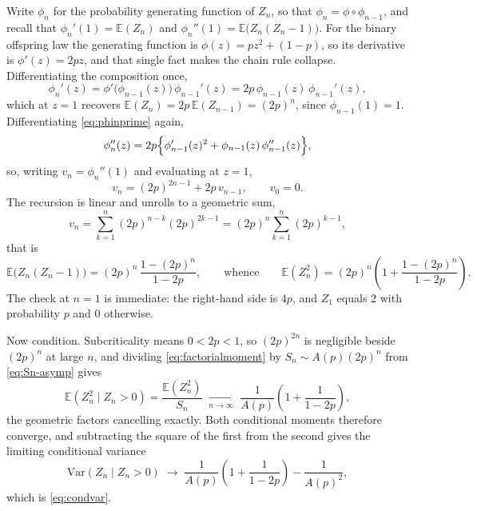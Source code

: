 \documentclass[11pt]{article}
\begin{document}
Write $\phi_n$ for the probability generating function of $Z_n$, so that $\phi_n=\phi\circ\phi_{n-1}$, and recall that $\phi_n'(1)=\mathbb{E}(Z_n)$ and $\phi_n''(1)=\mathbb{E}\bigl(Z_n(Z_n-1)\bigr)$. For the binary offspring law the generating function is $\phi(z)=pz^2+(1-p)$, so its derivative is $\phi'(z)=2pz$, and that single fact makes the chain rule collapse. Differentiating the composition once,
\begin{equation}
\label{eq:phinprime}
\phi_n'(z) = \phi'\bigl(\phi_{n-1}(z)\bigr)\,\phi_{n-1}'(z)
= 2p\,\phi_{n-1}(z)\,\phi_{n-1}'(z),
\end{equation}
which at $z=1$ recovers $\mathbb{E}(Z_n)=2p\,\mathbb{E}(Z_{n-1})=(2p)^n$, since $\phi_{n-1}(1)=1$. Differentiating \eqref{eq:phinprime} again,
\begin{equation}
\label{eq:phinsecond}
\phi_n''(z)
= 2p\Bigl\{\phi_{n-1}'(z)^2 + \phi_{n-1}(z)\,\phi_{n-1}''(z)\Bigr\},
\end{equation}
so, writing $v_n=\phi_n''(1)$ and evaluating at $z=1$,
\begin{equation}
\label{eq:vnrecursion}
v_n = (2p)^{2n-1} + 2p\,v_{n-1},
\qquad v_0 = 0 .
\end{equation}
The recursion is linear and unrolls to a geometric sum,
\[
v_n=\sum_{k=1}^{n}(2p)^{n-k}(2p)^{2k-1}
=(2p)^n\sum_{k=1}^{n}(2p)^{k-1},
\]
that is
\begin{equation}
\label{eq:factorialmoment}
\mathbb{E}\bigl(Z_n(Z_n-1)\bigr) = (2p)^n\,\frac{1-(2p)^n}{1-2p},
\qquad\text{whence}\qquad
\mathbb{E}(Z_n^2) = (2p)^n\left(1+\frac{1-(2p)^n}{1-2p}\right).
\end{equation}
The check at $n=1$ is immediate: the right-hand side is $4p$, and $Z_1$ equals $2$ with probability $p$ and $0$ otherwise.

Now condition. Subcriticality means $0<2p<1$, so $(2p)^{2n}$ is negligible beside $(2p)^n$ at large $n$, and dividing \eqref{eq:factorialmoment} by $S_n\sim A(p)(2p)^n$ from \eqref{eq:Sn-asymp} gives
\begin{equation}
\label{eq:condsecondmoment}
\mathbb{E}(Z_n^2\mid Z_n>0)
= \frac{\mathbb{E}(Z_n^2)}{S_n}
\;\xrightarrow[n\to\infty]{}\;
\frac{1}{A(p)}\left(1+\frac{1}{1-2p}\right),
\end{equation}
the geometric factors cancelling exactly. Both conditional moments therefore converge, and subtracting the square of the first from the second gives the limiting conditional variance
\begin{equation}
\label{eq:condvar-app}
\mathrm{Var}(Z_n\mid Z_n>0)
\;\longrightarrow\;
\frac{1}{A(p)}\left(1+\frac{1}{1-2p}\right) - \frac{1}{A(p)^2},
\end{equation}
which is \eqref{eq:condvar}.
\end{document}
